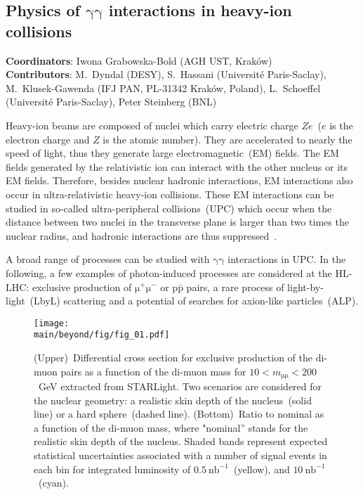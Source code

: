 \subsection{Physics of $\mathrm{\gamma \gamma}$ interactions in heavy-ion collisions}
\label{sec:upc}

{ \small
\noindent \textbf{Coordinators}: Iwona Grabowska-Bold (AGH UST, Krak\'ow)\\

\noindent \textbf{Contributors}: 
M.~Dyndal (DESY), 
S.~Hassani (Universit\'e Paris-Saclay), 
M.~Klusek-Gawenda (IFJ PAN, PL-31342 Krak\'ow, Poland), 
L.~Schoeffel (Universit\'e Paris-Saclay), Peter Steinberg (BNL)
}

Heavy-ion beams are composed of nuclei which carry electric charge $Ze$~($e$ is the electron charge and $Z$ is the atomic number). They are accelerated to nearly the speed of light, thus they generate large electromagnetic~(EM) fields. 
The EM fields generated by the relativistic ion can interact with the other nucleus or its EM fields.
Therefore, besides nuclear hadronic interactions, EM
interactions also occur in ultra-relativistic heavy-ion collisions.
These EM interactions can be studied in so-called ultra-peripheral
collisions~(UPC) which occur when the distance between two nuclei in the transverse plane is larger than two times the nuclear radius, and hadronic interactions are thus suppressed~\cite{Bertulani:2005ru}.

A broad range of processes can be studied with $\mathrm{\gamma\gamma}$ interactions in UPC. In the following, a few examples of photon-induced processes are considered at the HL-LHC: exclusive production of $\mathrm{\mu^+\mu^-}$ or p$\mathrm{\bar{p}}$ pairs, a rare process of light-by-light~(LbyL) scattering and a potential of searches for axion-like particles~(ALP).

\begin{figure}[!hbt]
\centering
\texttt{[image: \\main/beyond/fig/fig\_01.pdf]}
\caption{
(Upper)~Differential cross section for exclusive production of the di-muon pairs as a function of the di-muon mass for
$10<m_{\mathrm{\mu\mu}}<200$~GeV extracted from STARLight. Two
scenarios are considered for the nuclear geometry: a realistic skin
depth of the nucleus~(solid line) or a hard sphere~(dashed
line). (Bottom)~Ratio to nominal as a function of the di-muon mass,
where "nominal'' stands for the realistic skin depth of the nucleus.
 Shaded bands represent expected statistical uncertainties associated with a number of signal events in each bin for integrated luminosity of $0.5~\mathrm{nb}^{-1}$~(yellow), and $10~\mathrm{nb}^{-1}$~(cyan).}
\label{fig:mumu}
\end{figure}

